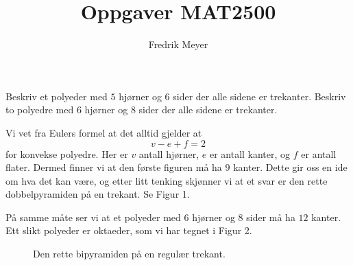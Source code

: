 \documentclass[11pt, norsk]{article}
\begin{document}
\title{Oppgaver MAT2500}
\author{Fredrik Meyer}
\maketitle 
\begin{oppg}
Beskriv et polyeder med $5$ hjørner og $6$ sider der alle sidene er trekanter. Beskriv to polyedre med $6$ hjørner og $8$ sider der alle sidene er trekanter.
\end{oppg}
\begin{losn}
Vi vet fra Eulers formel at det alltid gjelder at
\[
v-e+f = 2
\]
for konvekse polyedre. Her er $v$ antall hjørner, $e$ er antall kanter, og $f$ er antall flater. Dermed finner vi at den første figuren må ha $9$ kanter. Dette gir oss en ide om hva det kan være, og etter litt tenking skjønner vi at et svar er den rette dobbelpyramiden på en trekant. Se Figur 1.

På samme måte ser vi at et polyeder med $6$ hjørner og $8$ sider må ha $12$ kanter. Ett slikt polyeder er oktaeder, som vi har tegnet i Figur 2. 

\begin{figure}[h]
\begin{center}

\end{center}
\caption{Den rette bipyramiden på en regulær trekant.}
\end{figure}

\begin{figure}[h]
\begin{center}


\end{center}
\end{figure}
\end{losn}
\end{document}
